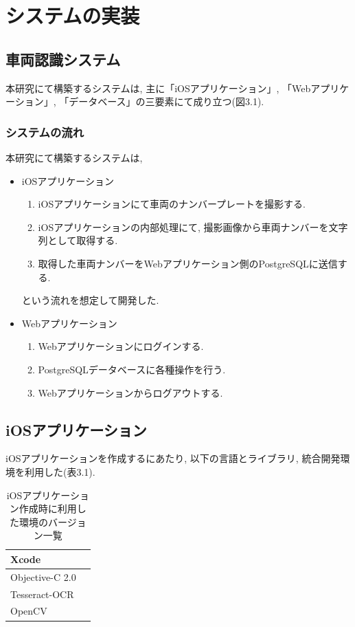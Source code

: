 \chapter{システムの実装}
\label{chap:poordirection}

\section{車両認識システム}
本研究にて構築するシステムは, 主に「iOSアプリケーション」, 「Webアプリケーション」, 「データベース」の三要素にて成り立つ(図3.1).

\subsection{システムの流れ}
本研究にて構築するシステムは,
\begin{itemize}
\item iOSアプリケーション
\begin{enumerate}
\item iOSアプリケーションにて車両のナンバープレートを撮影する.
\item iOSアプリケーションの内部処理にて, 撮影画像から車両ナンバーを文字列として取得する.
\item 取得した車両ナンバーをWebアプリケーション側のPostgreSQLに送信する.
\end{enumerate}
という流れを想定して開発した.

\item Webアプリケーション
\begin{enumerate}
\item Webアプリケーションにログインする.
\item PostgreSQLデータベースに各種操作を行う.
\item Webアプリケーションからログアウトする.
\end{enumerate}
\end{itemize}

\section{iOSアプリケーション}
iOSアプリケーションを作成するにあたり, 以下の言語とライブラリ, 統合開発環境を利用した(表3.1).

\begin{table}
\begin{center}
\begin{tabular}{|l|l|} \hline
Xcode &  \\ \hline
Objective-C 2.0 & \\ \hline
Tesseract-OCR & \\ \hline
OpenCV & \\ \hline
\end{tabular}
\end{center}
\caption{iOSアプリケーション作成時に利用した環境のバージョン一覧}
\end{table}

